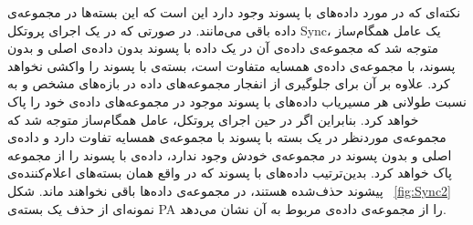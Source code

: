 نکته‌ای که در مورد داده‌های با پسوند  وجود دارد این است که این بسته‌ها در مجموعه‌ی داده باقی می‌مانند. در صورتی که در یک اجرای پروتکل Sync، یک عامل همگام‌ساز متوجه شد که مجموعه‌ی داده‌ی آن در یک داده با پسوند  بدون داده‌ی اصلی و بدون پسوند، با مجموعه‌ی داده‌ی همسایه متفاوت است، بسته‌ی با پسوند  را واکشی نخواهد کرد. علاوه بر آن برای جلوگیری از انفجار مجموعه‌های داده در بازه‌های مشخص و به نسبت طولانی هر مسیریاب داده‌های با پسوند  موجود در مجموعه‌های داده‌ی خود را پاک خواهد کرد. بنابراین اگر در حین اجرای پروتکل، عامل همگام‌ساز متوجه شد که مجموعه‌ی موردنظر در یک بسته با پسوند  با مجموعه‌ی همسایه تفاوت دارد و داده‌ی اصلی و بدون پسوند در مجموعه‌ی خودش وجود ندارد، داده‌ی با پسوند را از مجموعه پاک خواهد کرد. بدین‌ترتیب داده‌های با پسوند  که در واقع همان بسته‌های اعلام‌کننده‌ی پیشوند حذف‌شده هستند، در مجموعه‌ی داده‌ها باقی نخواهند ماند. شکل ~\ref{fig:Sync2} نمونه‌ای از حذف یک بسته‌ی PA را از مجموعه‌ی داده‌ی مربوط به آن نشان می‌دهد. 



